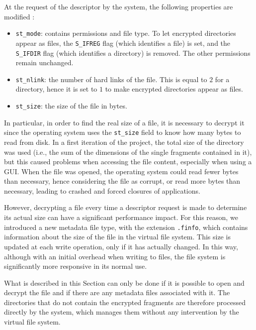 \documentclass[a4paper,12pt,twoside,openright]{report}
\begin{document}
  At the request of the descriptor by the system, the following properties are modified \cite{linuxmanstat}:
  \begin{itemize}
    \item \texttt{st\_mode}: contains permissions and file type.
          To let encrypted directories appear as files, the \texttt{S\_IFREG} flag (which identifies a file) is set,
          and the \texttt{S\_IFDIR} flag (which identifies a directory) is removed. The other permissions remain unchanged.
    \item \texttt{st\_nlink}: the number of hard links of the file.
          This is equal to $2$ for a directory, hence it is set to $1$ to make encrypted directories appear as files.
    \item \texttt{st\_size}: the size of the file in bytes.
  \end{itemize}

  In particular, in order to find the real size of a file, it is necessary to decrypt it since the operating
  system uses the \texttt{st\_size} field to know how many bytes to read from disk\footnotemark.
  In a first iteration of the project, the total size of the directory was used (i.e., the sum of the dimensions
  of the single fragments contained in it), but this caused problems when accessing the file content, especially when using a GUI.
  When the file was opened, the operating system could read fewer bytes than necessary, hence considering the file as corrupt, or
  read more bytes than necessary, leading to crashed and forced closures of applications.

  However, decrypting a file every time a descriptor request is made to determine its actual size can have a significant performance impact.
  For this reason, we introduced a new metadata file type, with the extension \texttt{.finfo}, which contains
  information about the size of the file in the virtual file system.
  This size is updated at each write operation, only if it has actually changed.
  In this way, although with an initial overhead when writing to files, the file system is significantly more responsive in its normal use.
  
  What is described in this Section can only be done if it is possible to open and decrypt the file
  and if there are any metadata files associated with it.
  The directories that do not contain the encrypted fragments are therefore processed directly by the system,
  which manages them without any intervention by the virtual file system.
\end{document}
